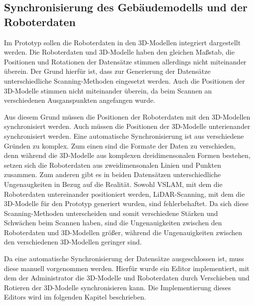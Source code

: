 \subsection{Synchronisierung des Gebäudemodells und der Roboterdaten}
Im Prototyp sollen die Roboterdaten in den 3D-Modellen integriert dargestellt werden. Die Roboterdaten und 3D-Modelle haben den gleichen Maßstab, die Positionen und Rotationen der Datensätze stimmen allerdings nicht miteinander überein. Der Grund hierfür ist, dass zur Generierung der Datensätze unterschiedliche Scanning-Methoden eingesetzt werden. Auch die Positionen der 3D-Modelle stimmen nicht miteinander überein, da beim Scannen an verschiedenen Ausganspunkten angefangen wurde.

Aus diesem Grund müssen die Positionen der Roboterdaten mit den 3D-Modellen synchronisiert werden. Auch müssen die Positionen der 3D-Modelle unterienander synchronisiert werden. Eine automatische Synchronisierung ist aus verschiedene Gründen zu komplex. Zum einen sind die Formate der Daten zu verschieden, denn während die 3D-Modelle aus komplexen dreidimensonalen Formen bestehen, setzen sich die Roboterdaten aus zweidimensonalen Linien und Punkten zusammen. Zum anderen gibt es in beiden Datensätzen unterschiedliche Ungenaugkeiten in Bezug auf die Realität. Sowohl \ac{VSLAM}, mit dem die Roboterdaten untereinander positioniert werden, \ac{LiDAR}-Scanning, mit dem die 3D-Modelle für den Prototyp generiert wurden, sind fehlerbehaftet. Da sich diese Scanning-Methoden unterscheiden und somit verschiedene Stärken und Schwächen beim Scannen haben, sind die Ungenauigkeiten zwischen den Roboterdaten und 3D-Modellen größer, während die Ungenauigkeiten zwischen den verschiedenen 3D-Modellen geringer sind.

Da eine automatische Synchronisierung der Datensätze ausgeschlossen ist, muss diese manuell vorgenommen werden. Hierfür wurde ein Editor implementiert, mit dem der Administrator die 3D-Modelle und Roboterdaten durch Verschieben und Rotieren der 3D-Modelle synchronisieren kann. Die Implementierung dieses Editors wird im folgenden Kapitel beschrieben.
